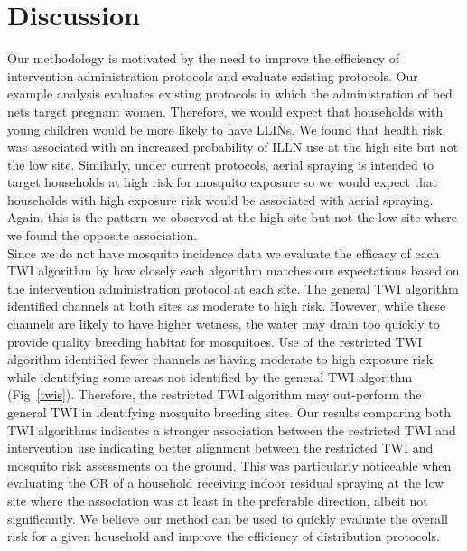 \documentclass[10pt,letterpaper]{article}\usepackage[]{graphicx}\usepackage[]{color}
\begin{document}
{\section*{Discussion}
Our methodology is motivated by the need to improve the efficiency of intervention administration protocols and evaluate existing protocols.  Our example analysis evaluates existing protocols in which the administration of bed nets target pregnant women.  Therefore,  we would expect that households with young children would be more likely to have LLINs.  We found that health risk was associated with an increased probability of ILLN use at the high site but not the low site.  Similarly, under current protocols, aerial spraying is intended to target households at high risk for mosquito exposure  so we would expect that households with high exposure risk would be associated with aerial spraying.  Again,  this is the pattern we observed at the high site but not the low site where we found the opposite association.\\

Since we do not have mosquito incidence data we evaluate the efficacy of each TWI algorithm by how closely each algorithm matches our expectations based on the intervention administration protocol at each site.  The general TWI algorithm identified channels at both sites as moderate to high risk.  However, while these channels are likely to have higher wetness, the water may drain too quickly to provide quality breeding habitat for mosquitoes.  Use of the restricted TWI algorithm identified fewer channels as having moderate to high exposure risk while identifying some areas not identified by the general TWI algorithm (Fig~\ref{twis}).  Therefore, the restricted TWI algorithm may out-perform the general TWI in identifying mosquito breeding sites.  Our results comparing both TWI algorithms indicates a stronger association between the restricted TWI and intervention use indicating better alignment between the restricted TWI and mosquito risk assessments on the ground. This was particularly noticeable when evaluating the OR of a household receiving indoor residual spraying at the low site where the association was at least in the preferable direction, albeit not significantly.  We believe our method can be used to quickly evaluate the overall risk for a given household and improve the efficiency of distribution protocols.\\

}
\end{document}
